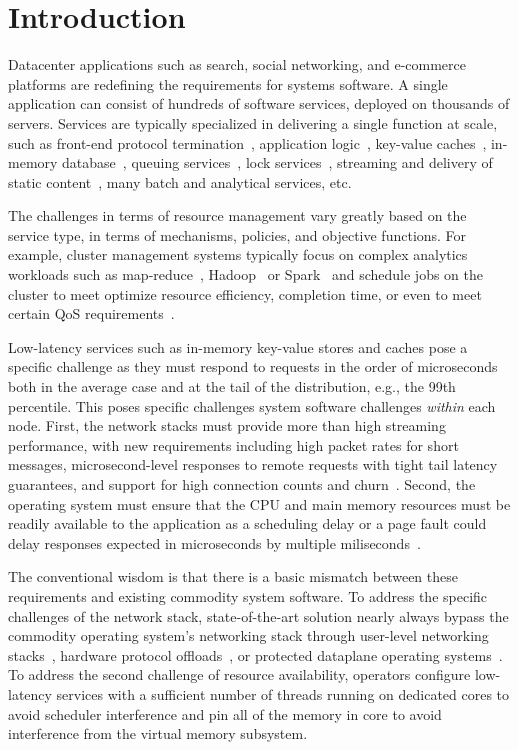 
\section{Introduction}



Datacenter applications such as search, social networking, and
e-commerce platforms are redefining the requirements for systems
software. A single application can consist of hundreds of software
services, deployed on thousands of servers.  Services are typically
specialized in delivering a single function at scale, such as
front-end protocol termination~\cite{missing}, application
logic~\cite{missing}, key-value caches~\cite{missing}, in-memory
database~\cite{missing}, queuing services~\cite{missing}, lock
services~\cite{missing}, streaming and delivery of static content~\cite{missing},
many batch and analytical services, etc.

The challenges in terms of resource management vary greatly based on
the service type, in terms of mechanisms, policies, and objective
functions.  For example, cluster management systems typically focus on
complex analytics workloads such as map-reduce~\cite{missing},
Hadoop~\cite{mising} or Spark~\cite{missing} and schedule jobs on the
cluster to meet optimize resource efficiency, completion time, or even
to meet certain QoS requirements~\cite{quasar, missing, missing}.

Low-latency services such as in-memory key-value stores and caches
pose a specific challenge as they must respond to requests in the
order of microseconds both in the average case and at the tail of the
distribution, e.g., the 99th percentile.  This poses specific
challenges system software challenges \emph{within} each node.  First,
the network stacks must provide more than high streaming performance,
with new requirements including high packet rates for short messages,
microsecond-level responses to remote requests with tight tail latency
guarantees, and support for high connection counts and
churn~\cite{Atikoglu:2012:WAL,DBLP:journals/cacm/DeanB13,DBLP:conf/nsdi/NishtalaFGKLLMPPSSTV13}.
Second, the operating system must ensure that the CPU and main memory
resources must be readily available to the application as a scheduling
delay or a page fault could delay responses expected in microseconds
by multiple miliseconds~\cite{missing}.

The conventional wisdom is that there is a basic mismatch between
these requirements and existing commodity system software.  To address
the specific challenges of the network stack, state-of-the-art
solution nearly always bypass the commodity operating system's
networking stack through user-level networking
stacks~\cite{mtcp,DBLP:conf/cloud/KapoorPTVV12,sandstorm,openonload,DBLP:conf/sigcomm/ThekkathNML93},
hardware protocol
offloads~\cite{dragojevic14farm,DBLP:conf/icpp/JoseSLZHWIOWSP11,mitchell:rdma,DBLP:conf/sosp/OngaroRSOR11},
or protected dataplane operating systems~\cite{ix-osdi}.  
To address the second challenge of resource availability, operators
configure low-latency services with a sufficient number of threads
running on dedicated cores to avoid scheduler interference and pin all
of the memory in core to avoid interference from the virtual memory
subsystem.

